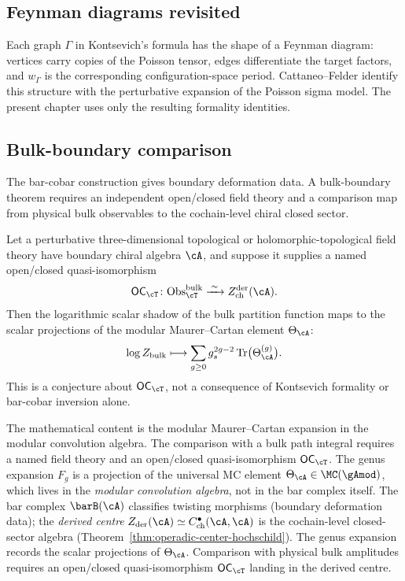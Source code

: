 \subsection{Feynman diagrams revisited}

Each graph \(\Gamma\) in Kontsevich's formula has the shape of a
Feynman diagram: vertices carry copies of the Poisson tensor, edges
differentiate the target factors, and \(w_\Gamma\) is the corresponding
configuration-space period. Cattaneo--Felder identify this structure
with the perturbative expansion of the Poisson sigma model. The present
chapter uses only the resulting formality identities.

\subsection{Bulk-boundary comparison}

The bar-cobar construction gives boundary deformation data. A
bulk-boundary theorem requires an independent open/closed field theory
and a comparison map from physical bulk observables to the
cochain-level chiral closed sector.

\begin{conjecture}\label{conj:deformation-holographic}
Let a perturbative three-dimensional topological or
holomorphic-topological field theory have boundary chiral algebra
\(\cA\), and suppose it supplies a named open/closed quasi-isomorphism
\[
\mathsf{OC}_{\cT}\colon
\mathrm{Obs}^{\mathrm{bulk}}_{\cT}
\xrightarrow{\;\sim\;}
Z^{\mathrm{der}}_{\mathrm{ch}}(\cA).
\]
Then the
logarithmic scalar shadow of the bulk partition function maps to the
scalar projections of the modular Maurer--Cartan element
\(\Theta_\cA\):
\[
\log Z_{\mathrm{bulk}}
\longmapsto
\sum_{g\geq0}g_s^{2g-2}
\operatorname{Tr}\bigl(\Theta_\cA^{(g)}\bigr).
\]
This is a conjecture about \(\mathsf{OC}_{\cT}\), not a
consequence of Kontsevich formality or bar-cobar inversion alone.
\end{conjecture}

\begin{remark}
The mathematical content is the modular Maurer--Cartan expansion in
the modular convolution algebra. The comparison with a bulk path
integral requires a named field theory and an open/closed
quasi-isomorphism \(\mathsf{OC}_{\cT}\).
The genus expansion $F_g$ is a projection of the universal MC
element $\Theta_\cA \in \MC(\gAmod)$, which lives in the
\emph{modular convolution algebra}, not in the bar complex itself.
The bar complex $\barB(\cA)$ classifies twisting morphisms
(boundary deformation data); the \emph{derived centre}
$Z_{\mathrm{der}}(\cA) \simeq C^\bullet_{\mathrm{ch}}(\cA,\cA)$
is the cochain-level closed-sector algebra
(Theorem~\ref{thm:operadic-center-hochschild}).
The genus expansion records the scalar projections of $\Theta_\cA$.
Comparison with physical bulk amplitudes requires an open/closed
quasi-isomorphism \(\mathsf{OC}_{\cT}\) landing in the derived centre.
\end{remark}

